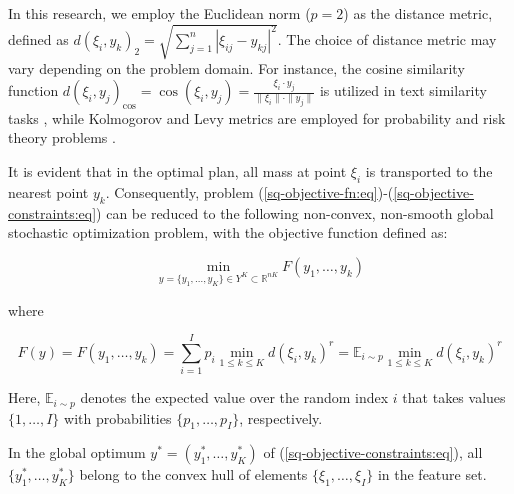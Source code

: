 In this research, we employ the Euclidean norm ($p = 2$) as the distance metric, defined as $ d(\xi_i, y_k)_2 = \sqrt{\sum_{j=1}^n | \xi_{ij} - y_{kj} |^2} $. The choice of distance metric may vary depending on the problem domain. For instance, the cosine similarity function $ d(\xi_i, y_j)_{\text{cos}} = \cos(\xi_i, y_j) = \frac{\xi_i \cdot y_j}{\| \xi_i \| \cdot \| y_j \|} $ is utilized in text similarity tasks \cite{Babic_2020,vor_der_bruck_pouly_2019}, while Kolmogorov and Levy metrics are employed for probability and risk theory problems \cite{Kuzmenko_Uryasev_2019}.

It is evident that in the optimal plan, all mass at point $\xi_i$ is transported to the nearest point $y_k$. Consequently, problem (\ref{sq-objective-fn:eq})-(\ref{sq-objective-constraints:eq}) can be reduced to the following non-convex, non-smooth global stochastic optimization problem, with the objective function defined as:

\begin{equation}
    \label{global-sq-objective-fn:eq}
        \min_{y = \{ y_1, \ldots, y_K \} \in Y^K \subset \mathbb{R}^{nK}} F(y_1, \ldots, y_k)
\end{equation}

\noindent where

\begin{equation}
    \label{global-sq-fn-expansion:eq}
        F(y) = F(y_1, \ldots, y_k) = \sum_{i=1}^I p_i \min_{1 \leq k \leq K} d(\xi_i, y_k)^r = \mathbb{E}_{i \sim p} \min_{1 \leq k \leq K} d(\xi_i, y_k)^r
\end{equation}

Here, $\mathbb{E}_{i \sim p}$ denotes the expected value over the random index $i$ that takes values $\{1, \ldots, I\}$ with probabilities $\{p_1, \ldots, p_I\}$, respectively.

\begin{lemma}
    \label{Lemma 1} In the global optimum $y^{*} = (y_1^{*}, \ldots, y_K^{*})$ of (\ref{sq-objective-constraints:eq}), all $\{y_1^{*}, \ldots, y_K^{*}\}$ belong to the convex hull of elements $\{\xi_1, \ldots, \xi_I\}$ in the feature set.
\end{lemma}

